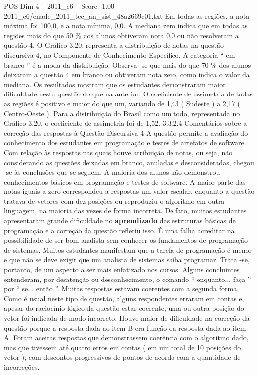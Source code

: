 \begin{textsample}{POS Dim 4 – 2011\_c6 – Score -1.00 – 2011\_c6/enade\_2011\_tec\_an\_sist\_48a2669c01.txt}
Em todas as regiões, a nota máxima foi 100,0, e a nota mínima, 0,0.
A mediana zero indica que em todas as regiões mais do que 50 \% dos alunos obtiveram nota 0,0 ou não resolveram a questão 4.
O Gráfico 3.20, representa a distribuição de notas na questão discursiva 4, no Componente de Conhecimento Específico.
A categoria “ em branco ” é a moda da distribuição.
Observa -se que mais do que 70 \% dos alunos deixaram a questão 4 em branco ou obtiveram nota zero, como indica o valor da mediana.
Os resultados mostram que os estudantes demonstraram maior dificuldade nesta questão do que na anterior.
O coeficiente de assimetria de todas as regiões é positivo e maior do que um, variando de 1,43 ( Sudeste ) a 2,17 ( Centro-Oeste ).
Para a distribuição do Brasil como um todo, representada no Gráfico 3.20, o coeficiente de assimetria foi de 1,52. 3.3.2.4 Comentários sobre a correção das respostas à Questão Discursiva 4 A questão permite a avaliação do conhecimento dos estudantes em programação e testes de artefatos de software.
Com relação às respostas nas quais houve atribuição de notas, ou seja, não considerando as questões deixadas em branco, anuladas e desconsideradas, chegou -se às conclusões que se seguem.
A maioria dos alunos não demonstrou conhecimentos básicos em programação e testes de software.
A maior parte das notas iguais a zero correspondeu a respostas um valor escalar, enquanto a questão tratava de vetores com dez posições ou reproduziu o algoritmo em outra linguagem, na maioria das vezes de forma incorreta.
De fato, muitos estudantes apresentaram grande dificuldade no \textbf{aprendizado} das estruturas básicas de programação e a correção da questão refletiu isso.
É uma falha acreditar na possibilidade de ser bom analista sem conhecer os fundamentos de programação de sistemas.
Muitos estudantes manifestam que a tarefa de programação é menor e que não se deve exigir que um analista de sistemas saiba programar.
Trata -se, portanto, de um aspecto a ser mais enfatizado nos cursos.
Alguns concluintes entenderam, por desatenção ou desconhecimento, o comando “ enquanto... faça ” por “ se... então ”.
Muitas respostas estavam coerentes com a segunda forma.
Como é usual neste tipo de questão, alguns respondentes erraram em contas e, apesar do raciocínio lógico da questão estar coerente, uma ou outra posição do vetor foi indicada de modo incorreto.
Houve maior de dificuldade na correção da questão porque a resposta dada ao item B era função da resposta dada ao item A.
Foram aceitas respostas que demonstrassem coerência com o algoritmo dado, mas que tivessem até quatro erros em contas ( em um total de 10 posições do vetor ), com descontos progressivos de pontos de acordo com a quantidade de incorreções.

\end{textsample}
